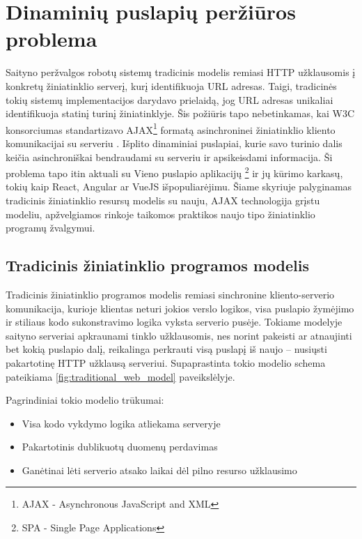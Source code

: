 \section{Dinaminių puslapių peržiūros problema}

Saityno peržvalgos robotų sistemų tradicinis modelis remiasi HTTP užklausomis į konkretų žiniatinklio serverį, kurį identifikuoja URL adresas. Taigi, tradicinės tokių sistemų implementacijos darydavo prielaidą, jog URL adresas unikaliai identifikuoja statinį turinį žiniatinklyje. Šis požiūris tapo nebetinkamas, kai W3C konsorciumas standartizavo AJAX\footnote{AJAX - Asynchronous JavaScript and XML} formatą asinchroninei žiniatinklio kliento komunikacijai su serveriu \cite{AJAXCrawlResearch}. Išplito dinaminiai puslapiai, kurie savo turinio dalis keičia asinchroniškai bendraudami su serveriu ir apsikeisdami informacija. Ši problema tapo itin aktuali su Vieno puslapio aplikacijų \footnote{SPA - Single Page Applications} ir jų kūrimo karkasų, tokių kaip React, Angular ar VueJS išpopuliarėjimu. Šiame skyriuje palyginamas tradicinis žiniatinklio resursų modelis su nauju, AJAX technologija grįstu modeliu, apžvelgiamos rinkoje taikomos praktikos naujo tipo žiniatinklio programų žvalgymui.

\subsection{Tradicinis žiniatinklio programos modelis}

Tradicinis žiniatinklio programos modelis remiasi sinchronine kliento-serverio komunikacija, kurioje klientas neturi jokios verslo logikos, visa puslapio žymėjimo ir stiliaus kodo sukonstravimo logika vyksta serverio pusėje. Tokiame modelyje saityno serveriai apkraunami tinklo užklausomis, nes norint pakeisti ar atnaujinti bet kokią puslapio dalį, reikalinga perkrauti visą puslapį iš naujo -- nusiųsti pakartotinę HTTP užklausą serveriui. Supaprastinta tokio modelio schema pateikiama \ref{fig:traditional_web_model} paveikslėlyje. 



Pagrindiniai tokio modelio trūkumai:
\begin{itemize}
    \item Visa kodo vykdymo logika atliekama serveryje
    \item Pakartotinis dublikuotų duomenų perdavimas
    \item Ganėtinai lėti serverio atsako laikai dėl pilno resurso užklausimo
\end{itemize}


